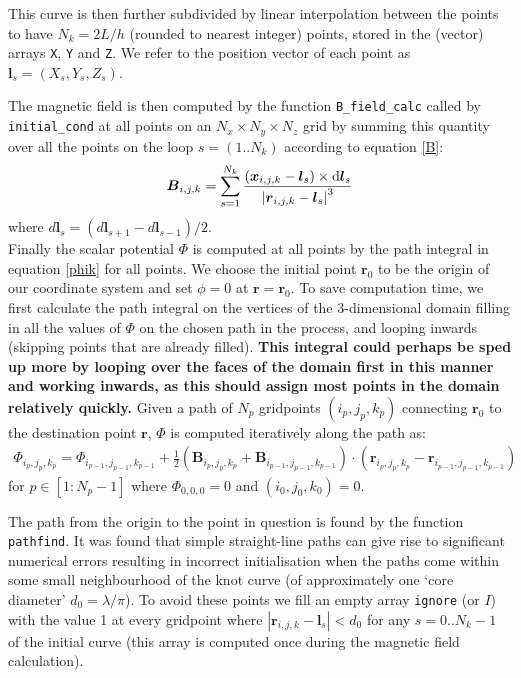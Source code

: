 \documentclass[notitlepage,aps,amsmath,amssymb,11pt]{revtex4-1}
\newcommand{\norm}[1]{\left| #1 \right|}
\renewcommand{\vec}[1]{\boldsymbol{#1}}
\begin{document}
This curve is then further subdivided by linear interpolation between the points to have $N_k =  2 L / h $ (rounded to nearest integer) points, stored in the (vector) arrays \verb'X', \verb'Y' and \verb'Z'. We refer to the position vector of each point as $\vec{l}_s = (X_s, Y_s, Z_s)$. 

The magnetic field is then computed by the function \verb'B_field_calc' called by \verb'initial_cond' at all points on an $N_x \times N_y \times N_z$ grid by summing this quantity over all the points on the loop $s=(1..N_k)$ according to equation \eqref{B}:
\begin{align}
\vec{B}_{i,j,k} = \sum_{s=1}^{N_k} \frac{(\vec{x}_{i,j,k}-\vec{l}_s) \times {\rm d}\vec{l}_s}{\norm{\vec{r}_{i,j,k}-\vec{l}_s}^3}
\end{align}
where $d \vec{l}_s = (d \vec{l}_{s+1} - d \vec{l}_{s-1})/2$. \\

Finally the scalar potential $\Phi$ is computed at all points by the path integral in equation \eqref{phik} for all points. We choose the initial point $\vec{r}_0$ to be the origin of our coordinate system and set $\phi=0$ at $\vec{r}=\vec{r}_0$. To save computation time, we first calculate the path integral on the vertices of the 3-dimensional domain filling in all the values of $\Phi$ on the chosen path in the process, and looping inwards (skipping points that are already filled). {\bf This integral could perhaps be sped up more by looping over the faces of the domain first in this manner and working inwards, as this should assign most points in the domain relatively quickly.} Given a path of $N_p$ gridpoints $(i_p, j_p, k_p)$ connecting $\vec{r}_0$ to the destination point $\vec{r}$, $\Phi$ is computed iteratively along the path as:
\begin{align}
\Phi_{i_p,j_p,k_p} = \Phi_{i_{p-1},j_{p-1},k_{p-1}}  + \frac{1}{2}(\vec{B}_{i_p,j_p,k_p} + \vec{B}_{i_{p-1},j_{p-1},k_{p-1}})\cdot(\vec{r}_{i_p,j_p,k_p} - \vec{r}_{i_{p-1},j_{p-1},k_{p-1}}) 
\end{align}
for $p \in [1:N_p-1]$ where $\Phi_{0,0,0}=0$ and $(i_0,j_0,k_0) = 0$.

The path from the origin to the point in question is found by the function \verb'pathfind'. It was found that simple straight-line paths can give rise to significant numerical errors resulting in incorrect initialisation when the paths come within some small neighbourhood of the knot curve (of approximately one `core diameter' $d_0 = \lambda/\pi$). To avoid these points we fill an empty array \verb'ignore' (or $I$) with the value 1 at every gridpoint where $\norm{\vec{r}_{i,j,k}-\vec{l}_s} < d_0$ for any $s=0..N_k-1$ of the initial curve (this array is computed once during the magnetic field calculation). 
\end{document}
